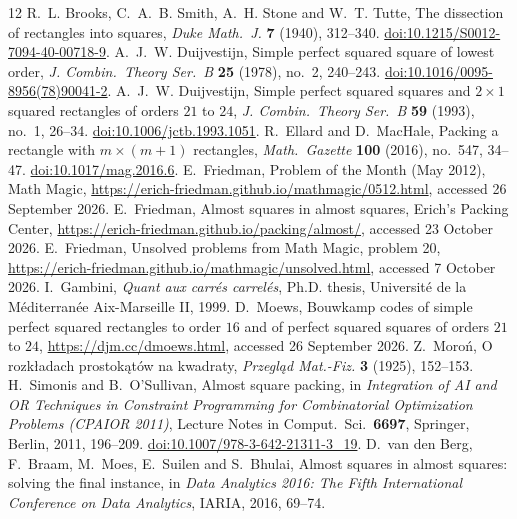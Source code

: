 \documentclass[11pt]{amsart}
\theoremstyle{definition}
\begin{document}
\begin{thebibliography}{12}
 R.~L. Brooks, C.~A.~B. Smith, A.~H. Stone and W.~T. Tutte, The dissection of
rectangles into squares, \emph{Duke Math.\ J.} \textbf{7} (1940), 312--340.
\href{https://doi.org/10.1215/S0012-7094-40-00718-9}{doi:10.1215/S0012-7094-40-00718-9}.
 A.~J.~W. Duijvestijn, Simple perfect squared square of lowest order,
\emph{J. Combin.\ Theory Ser.~B} \textbf{25} (1978), no.~2, 240--243.
\href{https://doi.org/10.1016/0095-8956(78)90041-2}{doi:10.1016/0095-8956(78)90041-2}.
 A.~J.~W. Duijvestijn, Simple perfect squared squares and $2\times1$ squared
rectangles of orders $21$ to $24$, \emph{J. Combin.\ Theory Ser.~B} \textbf{59} (1993), no.~1, 26--34.
\href{https://doi.org/10.1006/jctb.1993.1051}{doi:10.1006/jctb.1993.1051}.
 R.~Ellard and D.~MacHale, Packing a rectangle with $m\times(m+1)$ rectangles,
\emph{Math.\ Gazette} \textbf{100} (2016), no.~547, 34--47.
\href{https://doi.org/10.1017/mag.2016.6}{doi:10.1017/mag.2016.6}.
 E.~Friedman, Problem of the Month (May 2012), Math Magic,
\url{https://erich-friedman.github.io/mathmagic/0512.html}, accessed 26 September 2026.
 E.~Friedman, Almost squares in almost squares, Erich's Packing Center, \url{https://erich-friedman.github.io/packing/almost/}, accessed 23 October 2026.
 E.~Friedman, Unsolved problems from Math Magic, problem 20,
\url{https://erich-friedman.github.io/mathmagic/unsolved.html}, accessed 7 October 2026.
 I.~Gambini, \emph{Quant aux carr\'es carrel\'es}, Ph.D. thesis, Universit\'e de la
M\'editerran\'ee Aix-Marseille II, 1999.
 D.~Moews, Bouwkamp codes of simple perfect squared rectangles to order $16$ and of
perfect squared squares of orders $21$ to $24$, \url{https://djm.cc/dmoews.html}, accessed
26 September 2026.
 Z.~Moro\'n, O rozk\l adach prostok\k{a}t\'ow na kwadraty, \emph{Przegl\k{a}d
Mat.-Fiz.} \textbf{3} (1925), 152--153.
 H.~Simonis and B.~O'Sullivan, Almost square packing, in \emph{Integration of AI and
OR Techniques in Constraint Programming for Combinatorial Optimization Problems (CPAIOR 2011)},
Lecture Notes in Comput.\ Sci.\ \textbf{6697}, Springer, Berlin, 2011, 196--209.
\href{https://doi.org/10.1007/978-3-642-21311-3_19}{doi:10.1007/978-3-642-21311-3\_19}.
 D.~van den Berg, F.~Braam, M.~Moes, E.~Suilen and S.~Bhulai, Almost squares in almost
squares: solving the final instance, in \emph{Data Analytics 2016: The Fifth International Conference on
Data Analytics}, IARIA, 2016, 69--74.
\end{thebibliography}
\end{document}

